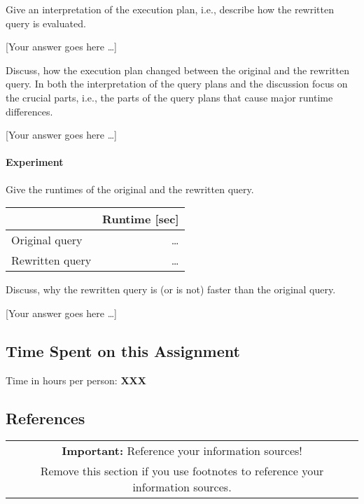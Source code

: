 \documentclass[11pt]{scrartcl}
\newcommand{\youranswerhere}{[Your answer goes here \ldots]}
\begin{document}
    Give an interpretation of the execution plan, i.e., describe how the rewritten query is evaluated.

    \youranswerhere{}

    Discuss, how the execution plan changed between the original and the rewritten query. In both the interpretation of the query plans and the discussion focus on the crucial parts, i.e., the parts of the query plans that cause major runtime differences.

    \youranswerhere{}

    \paragraph{Experiment}

    Give the runtimes of the original and the rewritten query.

    \begin{table}[H]
        \centering
        \begin{tabular}{l|r}
            & Runtime [sec] \tabularnewline
            \hline
            Original query  & \ldots \tabularnewline
            Rewritten query & \ldots \tabularnewline
        \end{tabular}
    \end{table}

    Discuss, why the rewritten query is (or is not) faster than the original query.

    \youranswerhere{}

    \subsection*{Time Spent on this Assignment}

    Time in hours per person: \textbf{XXX}

    \subsection*{References}

    \begin{table}[H]
        \centering
        \begin{tabular}{c}
            \hline
            \textbf{Important:} Reference your information sources! \tabularnewline
            Remove this section if you use footnotes to reference your information sources. \tabularnewline
            \hline
        \end{tabular}
    \end{table}
\end{document}
